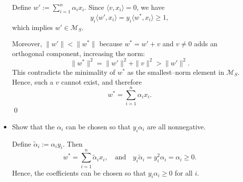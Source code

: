 \documentclass[a4paper]{article}
\begin{document}
\begin{itemize}
Define $w' := \sum_{i=1}^n \alpha_i x_i$.  
Since $\langle v, x_i \rangle = 0$, we have 
\[
y_i \langle w', x_i \rangle = y_i \langle w^*, x_i \rangle \ge 1,
\]
which implies $w' \in \mathcal{M}_S$.  

Moreover, $\|w'\| < \|w^*\|$ because $w^* = w' + v$ and $v \neq 0$ adds an orthogonal component, increasing the norm:
\[
\|w^*\|^2 = \|w'\|^2 + \|v\|^2 > \|w'\|^2.
\]
This contradicts the minimality of $w^*$ as the smallest–norm element in $\mathcal{M}_S$.  
Hence, such a $v$ cannot exist, and therefore
\[
w^* = \sum_{i=1}^n \alpha_i x_i.
\]
\qed

    \item Show that the $\alpha_i$ can be chosen so that $y_i \alpha_i$ are all nonnegative.

Define \( \tilde{\alpha}_i := \alpha_i y_i \).
Then
\[
w^* = \sum_{i=1}^n \tilde{\alpha}_i x_i,
\quad \text{and} \quad
y_i \tilde{\alpha}_i = y_i^2 \alpha_i = \alpha_i \ge 0.
\]
Hence, the coefficients can be chosen so that \( y_i \alpha_i \ge 0 \) for all \( i \).
\end{itemize}
\end{document}

